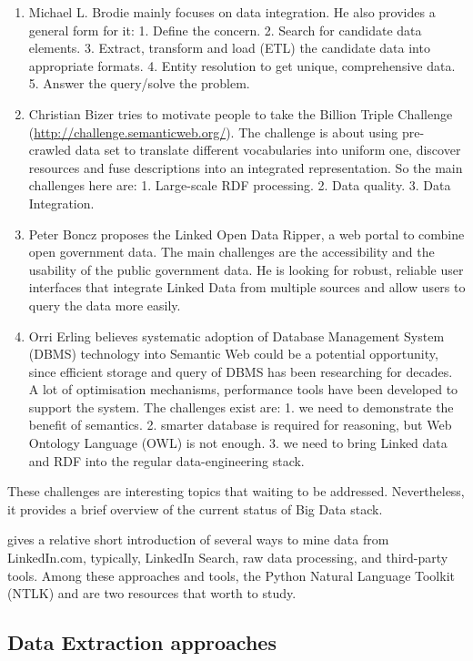 	\begin{enumerate}
	\item
	Michael L. Brodie mainly focuses on data integration. He also provides a general form for it: 1. Define the concern. 2. Search for candidate data elements. 3. Extract, transform and load (ETL) the candidate data into appropriate formats. 4. Entity resolution to get unique, comprehensive data. 5. Answer the query/solve the problem. 
	\item
	Christian Bizer tries to motivate people to take the Billion Triple Challenge (\url{http://challenge.semanticweb.org/}). The challenge is about using pre-crawled data set to translate different vocabularies into uniform one, discover resources and fuse descriptions into an integrated representation. So the main challenges here are: 1. Large-scale RDF processing. 2. Data quality. 3. Data Integration. 
	\item
	Peter Boncz proposes the Linked Open Data Ripper, a web portal to combine open government data. The main challenges are the accessibility and the usability of  the public government data. He is looking for robust, reliable user interfaces that integrate Linked Data from multiple sources and allow users to query the data more easily.  
	\item
	Orri Erling believes systematic adoption of Database Management System (DBMS) technology into Semantic Web could be a potential opportunity, since efficient storage and query of DBMS has been researching for decades. A lot of optimisation mechanisms, performance tools have been developed to support the system. The challenges exist are: 1. we need to demonstrate the benefit of semantics. 2. smarter database is required for reasoning, but Web Ontology Language (OWL) is not enough. 3. we need to bring Linked data and RDF into the regular data-engineering stack.
	\end{enumerate}
  
These challenges are interesting topics that waiting to be addressed. Nevertheless, it provides a brief overview of the current status of Big Data stack.

\cite{bradbury2011} gives a relative short introduction of several ways to mine data from LinkedIn.com, typically, LinkedIn Search, raw data processing, and third-party tools. Among these approaches and tools, the Python Natural Language Toolkit (NTLK) and \cite{russell2011} are two resources that worth to study.

\subsection{Data Extraction approaches}

